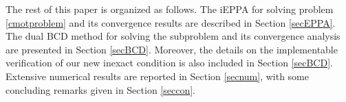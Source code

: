 \documentclass[10pt]{article}
\newcommand{\blue}[1]{\begin{color}{blue}#1\end{color}}
\begin{document}


The rest of this paper is organized as follows.
The iEPPA for solving problem \eqref{cmotproblem} and its convergence results are described in Section \ref{secEPPA}. The dual BCD method for solving the subproblem and its convergence analysis are presented in Section \ref{secBCD}. Moreover, the details on the implementable verification of our new inexact condition
is also included in Section \ref{secBCD}. Extensive numerical results are reported in Section \ref{secnum}, with some concluding remarks given in Section \ref{seccon}.







\vspace{2mm}
\end{document}
